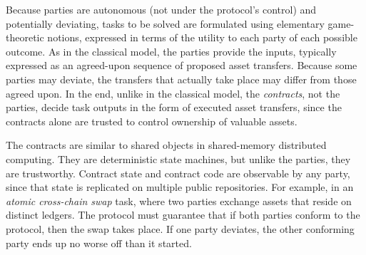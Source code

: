 Because parties are autonomous (not under the protocol's control)
and potentially deviating,
tasks to be solved are formulated using elementary game-theoretic notions,
expressed in terms of the utility to each party of each possible outcome.
As in the classical model, the parties provide the inputs,
typically expressed as an agreed-upon sequence of proposed asset transfers.
Because some parties may deviate,
the transfers that actually take place may
differ from those agreed upon.
In the end, unlike in the classical model,
the \emph{contracts}, not the parties,
decide task outputs in the form of executed asset transfers,
since the contracts alone are trusted to control ownership of valuable assets.

The contracts are similar to shared objects in shared-memory distributed computing.
They are  deterministic state machines, 
but unlike the parties,
they are trustworthy.
Contract state and contract code are observable by any party,
since that state is replicated on multiple public repositories.
For example,
in an \emph{atomic cross-chain swap} task,
where two parties exchange assets that
reside on distinct ledgers.
The protocol must guarantee that if both parties conform to the protocol, 
then the swap takes place.
If one party deviates,
the other conforming party ends up no worse off than it started.
